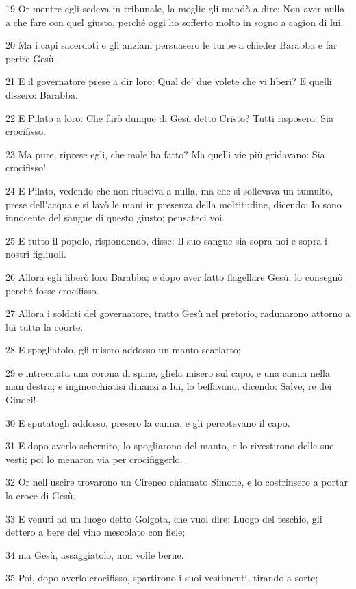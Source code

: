\par 19 Or mentre egli sedeva in tribunale, la moglie gli mandò a dire: Non aver nulla a che fare con quel giusto, perché oggi ho sofferto molto in sogno a cagion di lui.
\par 20 Ma i capi sacerdoti e gli anziani persuasero le turbe a chieder Barabba e far perire Gesù.
\par 21 E il governatore prese a dir loro: Qual de' due volete che vi liberi? E quelli dissero: Barabba.
\par 22 E Pilato a loro: Che farò dunque di Gesù detto Cristo? Tutti risposero: Sia crocifisso.
\par 23 Ma pure, riprese egli, che male ha fatto? Ma quelli vie più gridavano: Sia crocifisso!
\par 24 E Pilato, vedendo che non riusciva a nulla, ma che si sollevava un tumulto, prese dell'acqua e si lavò le mani in presenza della moltitudine, dicendo: Io sono innocente del sangue di questo giusto; pensateci voi.
\par 25 E tutto il popolo, rispondendo, disse: Il suo sangue sia sopra noi e sopra i nostri figliuoli.
\par 26 Allora egli liberò loro Barabba; e dopo aver fatto flagellare Gesù, lo consegnò perché fosse crocifisso.
\par 27 Allora i soldati del governatore, tratto Gesù nel pretorio, radunarono attorno a lui tutta la coorte.
\par 28 E spogliatolo, gli misero addosso un manto scarlatto;
\par 29 e intrecciata una corona di spine, gliela misero sul capo, e una canna nella man destra; e inginocchiatisi dinanzi a lui, lo beffavano, dicendo: Salve, re dei Giudei!
\par 30 E sputatogli addosso, presero la canna, e gli percotevano il capo.
\par 31 E dopo averlo schernito, lo spogliarono del manto, e lo rivestirono delle sue vesti; poi lo menaron via per crocifiggerlo.
\par 32 Or nell'uscire trovarono un Cireneo chiamato Simone, e lo costrinsero a portar la croce di Gesù.
\par 33 E venuti ad un luogo detto Golgota, che vuol dire: Luogo del teschio, gli dettero a bere del vino mescolato con fiele;
\par 34 ma Gesù, assaggiatolo, non volle berne.
\par 35 Poi, dopo averlo crocifisso, spartirono i suoi vestimenti, tirando a sorte;
